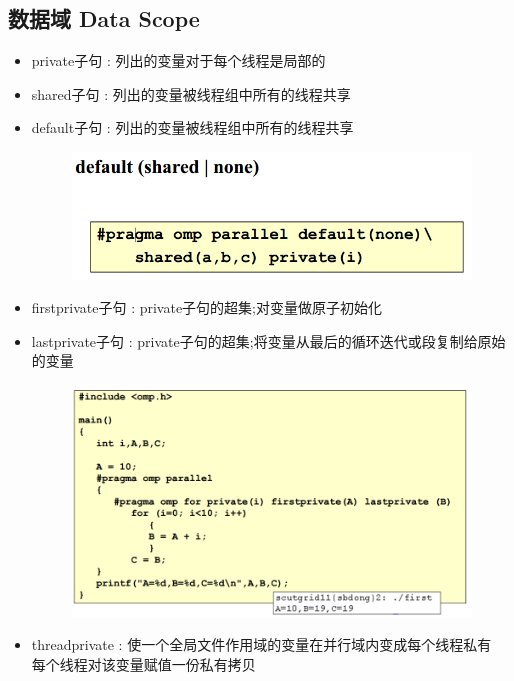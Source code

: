 \documentclass[UTF8,a4paper]{ctexart}
\begin{document}
\subsection{数据域 Data Scope}
\begin{itemize}
  \item private子句 : 列出的变量对于每个线程是局部的
  \item shared子句 : 列出的变量被线程组中所有的线程共享
  \item default子句 : 列出的变量被线程组中所有的线程共享
  \begin{figure}[H]
    \centering
    \includegraphics[scale = 0.3]{assets/ParallelComputing_55e9e.png}
  \end{figure}
  \item firstprivate子句 : private子句的超集;对变量做原子初始化
  \item lastprivate子句 : private子句的超集;将变量从最后的循环迭代或段复制给原始的变量
  \begin{figure}[H]
    \centering
    \includegraphics[scale = 0.3]{assets/ParallelComputing_8734c.png}
  \end{figure}
  \item threadprivate : 使一个全局文件作用域的变量在并行域内变成每个线程私有\\
  每个线程对该变量赋值一份私有拷贝
  \begin{figure}[H]
    \centering

\end{figure}
\end{itemize}
\end{document}
